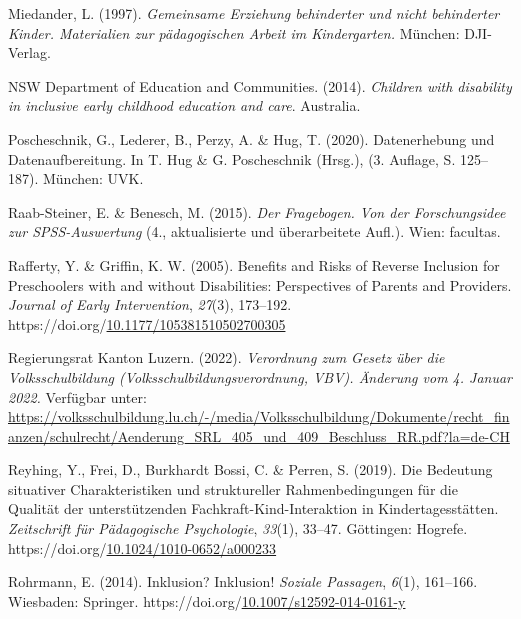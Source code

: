\documentclass[
  ngerman,
  11pt,
  paper=a4,
  twoside,
  titlepage=true,
  openright,
  abstract=on,
  toc=listofnumbered,
  numbers=noenddot,
  chapterprefix=true,
  headings=optiontohead,
  svgnames,
  dvipsnames]{scrreprt}
\newlength{\cslhangindent}
\newlength{\cslentryspacingunit} %
\newenvironment{CSLReferences}[2] %
 {%
  \setlength{\parindent}{0pt}
  \ifodd #1
  \let\oldpar\par
  \def\par{\hangindent=\cslhangindent\oldpar}
  \fi
  \setlength{\parskip}{#2\cslentryspacingunit}
 }%
 {}
\begin{document}
\begin{CSLReferences}{1}{0}
\leavevmode{}%
Miedander, L. (1997). \emph{Gemeinsame Erziehung behinderter und nicht
behinderter Kinder. Materialien zur pädagogischen Arbeit im
Kindergarten.} München: DJI-Verlag.

\leavevmode{}%
NSW Department of Education and Communities. (2014). \emph{Children with
disability in inclusive early childhood education and care}. Australia.

\leavevmode{}%
Poscheschnik, G., Lederer, B., Perzy, A. \& Hug, T. (2020).
Datenerhebung und Datenaufbereitung. In T. Hug \& G. Poscheschnik
(Hrsg.), (3. Auflage, S. 125–187). München: UVK.

\leavevmode{}%
Raab-Steiner, E. \& Benesch, M. (2015). \emph{Der Fragebogen. Von der
Forschungsidee zur SPSS-Auswertung} (4., aktualisierte und überarbeitete
Aufl.). Wien: facultas.

\leavevmode{}%
Rafferty, Y. \& Griffin, K. W. (2005). Benefits and Risks of Reverse
Inclusion for Preschoolers with and without Disabilities: Perspectives
of Parents and Providers. \emph{Journal of Early Intervention},
\emph{27}(3), 173–192.
https://doi.org/\href{https://doi.org/10.1177/105381510502700305}{10.1177/105381510502700305}

\leavevmode{}%
Regierungsrat Kanton Luzern. (2022). \emph{Verordnung zum Gesetz über
die Volksschulbildung (Volksschulbildungsverordnung, VBV). Änderung vom
4. Januar 2022.} Verfügbar unter:
\url{https://volksschulbildung.lu.ch/-/media/Volksschulbildung/Dokumente/recht_finanzen/schulrecht/Aenderung_SRL_405_und_409_Beschluss_RR.pdf?la=de-CH}

\leavevmode{}%
Reyhing, Y., Frei, D., Burkhardt Bossi, C. \& Perren, S. (2019). Die
Bedeutung situativer Charakteristiken und struktureller
Rahmenbedingungen für die Qualität der unterstützenden
Fachkraft-Kind-Interaktion in Kindertagesstätten. \emph{Zeitschrift für
Pädagogische Psychologie}, \emph{33}(1), 33–47. Göttingen: Hogrefe.
https://doi.org/\href{https://doi.org/10.1024/1010-0652/a000233}{10.1024/1010-0652/a000233}

\leavevmode{}%
Rohrmann, E. (2014). Inklusion? {Inklusion}! \emph{Soziale Passagen},
\emph{6}(1), 161–166. Wiesbaden: Springer.
https://doi.org/\href{https://doi.org/10.1007/s12592-014-0161-y}{10.1007/s12592-014-0161-y}


\end{CSLReferences}
\end{document}
